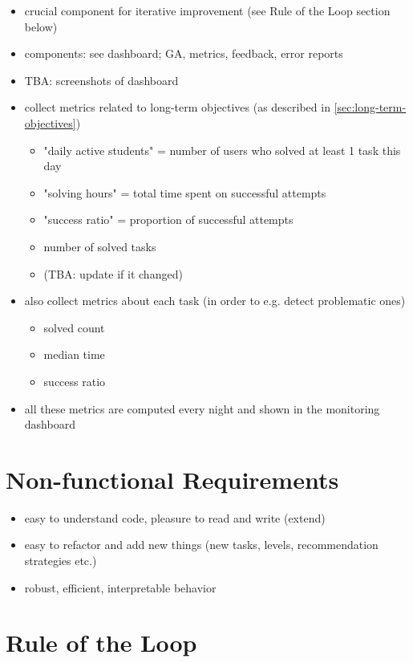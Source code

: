 \begin{itemize}
\item crucial component for iterative improvement (see Rule of the Loop section below)
\item components: see dashboard; GA, metrics, feedback, error reports
\item TBA: screenshots of dashboard
\item collect metrics related to long-term objectives (as described in \ref{sec:long-term-objectives})
  \begin{itemize}
  \item "daily active students" = number of users who solved at least 1 task this day
  \item "solving hours" = total time spent on successful attempts
  \item "success ratio" = proportion of successful attempts
  \item number of solved tasks
  \item (TBA: update if it changed)
  \end{itemize}
\item also collect metrics about each task (in order to e.g. detect problematic ones)
  \begin{itemize}
  \item solved count
  \item median time
  \item success ratio
  \end{itemize}
\item all these metrics are computed every night and shown in the monitoring dashboard
\end{itemize}


\section{Non-functional Requirements}
\label{sec:robomission.nonfunctional-requirements}

\begin{itemize}
\item easy to understand code, pleasure to read and write (extend)
\item easy to refactor and add new things (new tasks, levels, recommendation strategies etc.)
\item robust, efficient, interpretable behavior
\end{itemize}



\section{Rule of the Loop}
\label{sec:robomission.rule-of-the-loop}

